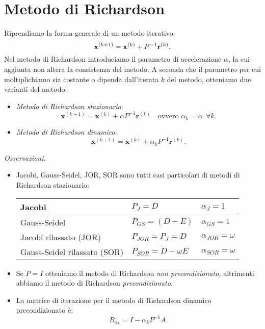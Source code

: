 \section{Metodo di Richardson}
Riprendiamo la forma generale di un metodo iterativo:
\begin{equation*}
\mathbf{x}^{( k+1)} =\mathbf{x}^{(k)} +P^{-1}\mathbf{r}^{(k)}.
\end{equation*}
Nel metodo di Richardson introduciamo il parametro di accelerazione $\alpha $, la cui aggiunta non altera la consistenza del metodo.
A seconda che il parametro per cui moltiplichiamo sia costante o dipenda dall'iterata $k$ del metodo, otteniamo due varianti del metodo:
\begin{itemize}
\item \textit{Metodo di Richardson stazionario}:
\begin{equation*}
\mathbf x^{( k+1)} =\mathbf x^{(k)} +\alpha P^{-1}\mathbf{r}^{(k)} \quad \text{ovvero } \alpha _{k} =\alpha \ \ \forall k.
\end{equation*}
\item \textit{Metodo di Richardson dinamico}:
\begin{equation*}
\mathbf x^{( k+1)} =\mathbf x^{(k)} +\alpha _{k} P^{-1}\mathbf{r}^{(k)}.
\end{equation*}
\end{itemize}
\textit{Osservazioni.}
\begin{itemize}
\item Jacobi, Gauss-Seidel, JOR, SOR sono tutti casi particolari di metodi di Richardson stazionario:
\begin{table}[H]
  \centering
  \def\arraystretch{1.5}
  \begin{tabular}{|l|l|l|}
    \hline
    Jacobi                       & $P_{J} =D$& $\alpha_{J} =1$\\ \hline
    Gauss-Seidel                 & $P_{GS} =( D-E)$ & $\alpha_{GS}=1$ \\ \hline
    Jacobi rilassato (JOR)       & $P_{JOR}=P_J=D$ & $\alpha_{JOR}=\omega$ \\ \hline
    Gauss-Seidel rilassato (SOR) & $P_{SOR}=D-\omega E$ & $\alpha_{SOR}=\omega$ \\ \hline
  \end{tabular}
\end{table}
\item Se $P=I$ otteniamo il metodo di Richardson \textit{non precondizionato,} altrimenti abbiamo il metodo di Richardson \textit{precondizionato.}
\item La matrice di iterazione per il metodo di Richardson dinamico precondizionato è:
\begin{equation*}
B_{\alpha _{k}} =I-\alpha _{k} P^{-1} A.
\end{equation*}
\end{itemize}
